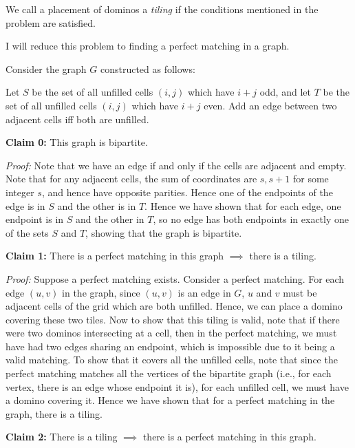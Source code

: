\documentclass[answers]{exam}
\begin{document}
\begin{questions}

    \begin{solution}

        We call a placement of dominos a \textit{tiling} if the conditions mentioned in the problem are satisfied.

I will reduce this problem to finding a perfect matching in a graph.

Consider the graph $G$ constructed as follows:

Let $S$ be the set of all unfilled cells $(i, j)$ which have $i + j$ odd, and let $T$ be the set of all unfilled cells $(i, j)$ which have $i + j$ even. Add an edge between two adjacent cells iff both are unfilled.

        \textbf{Claim 0:} This graph is bipartite.

        \textit{Proof:} Note that we have an edge if and only if the cells are adjacent and empty. Note that for any adjacent cells, the sum of coordinates are $s, s + 1$ for some integer $s$, and
        hence have opposite parities. Hence one of the endpoints of the edge is in $S$ and the other is in $T$. Hence we have shown that for each edge, one endpoint is in $S$ and the other in
        $T$, so no edge has both endpoints in exactly one of the sets $S$ and $T$, showing that the graph is bipartite.

        \textbf{Claim 1:} There is a perfect matching in this graph $\implies$ there is a tiling.

        \textit{Proof:} Suppose a perfect matching exists. Consider a perfect matching. For each edge $(u, v)$ in the graph, since $(u, v)$ is an edge in $G$, $u$ and $v$ must be adjacent cells of the grid which are both unfilled. Hence, we can place a domino covering these two tiles. Now to show that this tiling is valid, note that if there were two dominos intersecting at a cell, then in the perfect matching, we must have had two edges sharing an endpoint, which is impossible due to it being a valid matching. To show that it covers all the unfilled cells, note that since the perfect matching matches all the vertices of the bipartite graph (i.e., for each vertex, there is an edge whose endpoint it is), for each unfilled cell, we must have a domino covering it. Hence we have shown that for a perfect matching in the graph, there is a tiling.

        \textbf{Claim 2:} There is a tiling $\implies$ there is a perfect matching in this graph.


\end{solution}
\end{questions}
\end{document}

